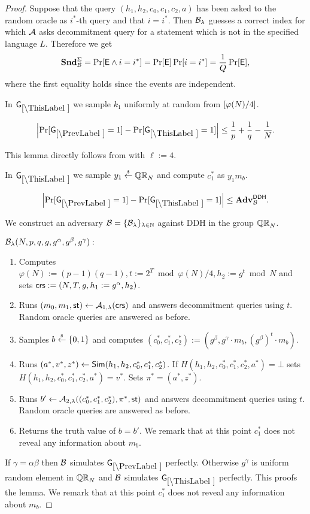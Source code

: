 \begin{proof}
Suppose that the query $(h_1, h_2,c_0,c_1,c_2,a)$ has been asked to the random oracle as $i^*$-th query and that $i=i^*$. Then $\mathcal{B}_{\lambda}$ guesses a correct index for which $\mathcal{A}$ asks decommitment query for a statement which is not in the specified language $L$. Therefore we get
\[\mathbf{Snd}^\Sigma_{\mathcal{B}} = \Pr[\mathsf{E} \land i=i^*] = \Pr[\mathsf{E}]\Pr[i=i^*] = \frac{1}{Q}\Pr[\mathsf{E}],\]
where the first equality holds since the events are independent.


In $\games_\thisgame$ we sample $k_1$ uniformly at random from $[\varphi(N)/4]$.

\begin{lemma}
\[
\left|\Pr[\games_\prevgame = 1] - \Pr[\games_\thisgame = 1]\right| \leq \frac{1}{p}+\frac{1}{q}-\frac{1}{N}.
\]
\end{lemma}

This lemma directly follows from  with $\ell:=4$.

In $\games_\thisgame$ we sample $y_1 \stackrel{{\scriptscriptstyle\$}}{\leftarrow} \mathbb{QR}_N$ and compute $c_1^*$ as  $y_1 m_b$. 

\begin{lemma}
\[
\left|\Pr[\games_\prevgame = 1] - \Pr[\games_\thisgame = 1]\right| \leq \advtg_\advB^\ddh.
\]
\end{lemma}
We construct an adversary $\mathcal{B} = \{\mathcal{B}_{\lambda}\}_{\lambda \in \mathbb{N}}$ against DDH in the group $\mathbb{QR}_N$. %

$\mathcal{B}_{\lambda}(N,p,q,g,g^\alpha, g^\beta, g^\gamma):$
\vspace{-2mm}
\begin{enumerate}
\item Computes $\varphi(N):=(p-1)(q-1), t:=2^{T} \bmod \varphi(N)/4, h_2:=g^t \bmod N$ and sets $\mathsf{crs}:=(N, T, g, h_1: = g^\alpha, h_2)$.
\item Runs $(m_0, m_1, \mathsf{st}) \leftarrow \mathcal{A}_{1, \lambda}(\mathsf{crs})$ and answers decommitment queries using $t$. Random oracle queries are answered as before.
\item Samples $b \stackrel{{\scriptscriptstyle\$}}{\leftarrow} \{0,1\}$ and computes $(c_0^*, c_1^*, c_2^*):=(g^\beta, g^\gamma \cdot m_b, (g^\beta)^t \cdot m_b).$ 
\item Runs $(a^*,v^*,z^*) \leftarrow \mathsf{Sim}(h_1, h_2, c_0^*, c_1^*, c_2^*)$. If $H(h_1, h_2, c_0^*, c_1^*, c_2^*,a^*) = \bot$ sets $H(h_1, h_2, c_0^*, c_1^*, c_2^*,a^*) = v^*$. Sets $\pi^* = (a^*,z^*)$.
\item Runs $b' \leftarrow \mathcal{A}_{2, \lambda}((c_0^*, c_1^*, c_2^*), \pi^*, \mathsf{st})$ and answers decommitment queries using $t$. Random oracle queries are answered as before.
\item Returns the truth value of $b=b'$. We remark that at this point $c_1^*$ does not reveal any information about $m_b$.
\end{enumerate}
If $\gamma = \alpha\beta$ then $\mathcal{B}$ simulates $\games_\prevgame$ perfectly. Otherwise $g^\gamma$ is uniform random element in $\mathbb{QR}_N$ and $\mathcal{B}$ simulates $\games_\thisgame$ perfectly. This proofs the lemma. We remark that at this point $c_1^*$ does not reveal any information about $m_b$.



\end{proof}
